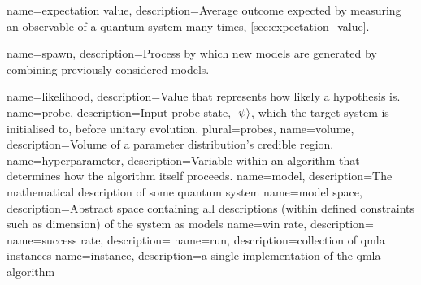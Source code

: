 







{
    name=expectation value,
    description={Average outcome expected by measuring an observable of a quantum system many times, \cref{sec:expectation_value}}.
}

{
    name=spawn,
    description={Process by which new models are generated by combining previously considered models.}
}

{
    name=likelihood,
    description={Value that represents how likely a hypothesis is.}
}
{
    name=probe,
    description={Input probe state, $\ket{\psi}$, which the target system is initialised to, before unitary evolution.}
    plural={probes},
}
{
    name=volume,
    description={Volume of a parameter distribution's credible region.}
}
{
    name=hyperparameter,
    description={Variable within an algorithm that determines how the algorithm itself proceeds.}
}
{
    name=model,
    description={The mathematical description of some quantum system}
}
{
    name=model space,
    description={Abstract space containing all descriptions (within defined constraints such as dimension) of the system as models}
}
{
    name=win rate,
    description={}
}
{
    name=success rate,
    description={}
}
{
    name=run,
    description={collection of \gls{qmla} instances}
}
{
    name=instance,
    description={a single implementation of the \gls{qmla} algorithm}
}

